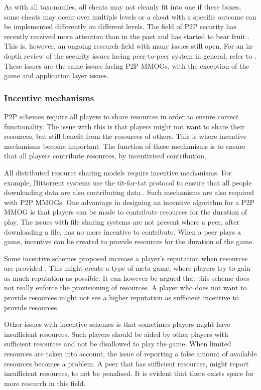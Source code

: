 As with all taxonomies, all cheats may not cleanly fit into one if these boxes, some cheats may occur over multiple levels or a cheat with a specific outcome can be implemented differently on different levels. The field of P2P security has recently received more attention than in the past and has
started to bear fruit \cite{survey_p2p_game_cheats}. This is, however, an ongoing research field with many issues still open. For an in-depth review
of the security issues facing peer-to-peer system in general, refer to \cite{p2p_security_issues}. These issues are the same issues facing P2P MMOGs, with the exception of the game and application layer issues.

\subsubsection{Incentive mechanisms}

P2P schemes require all players to share resources in order to ensure correct functionality. The issue with this is that players might not want to share their resources, but still benefit from the resources of others. This is where incentive mechanisms become important. The function of these
mechanisms is to ensure that all players contribute resources, by incentivised contribution.

All distributed resource sharing models require incentive mechanisms. For example, Bittorrent systems use the tit-for-tat protocol to ensure that all
people downloading data are also contributing data \cite{tit_for_tat}. Such mechanisms are also required with P2P MMOGs. One advantage in designing
an incentive algorithm for a P2P MMOG is that players can be made to contribute resources for the duration of play. The issues with file sharing
systems are not present where a peer, after downloading a file, has no more incentive to contribute. When a peer plays a game, incentive can be
created to provide resources for the duration of the game.

Some incentive schemes proposed increase a player's reputation when resources are provided \cite{classic_p2p_reputation} \cite{proactive_reputation}. This might create a type of meta game, where players try to gain as much reputation as possible. It can however be argued that this scheme does not really enforce the provisioning of resources. A player who does not want to provide resources might not see a higher reputation as sufficient incentive to provide resources.

Other issues with incentive schemes is that sometimes players might have insufficient resources. Such players should be aided by other players with
sufficient resources and not be disallowed to play the game. When limited resources are taken into account, the issue of reporting a false amount of
available resources becomes a problem. A peer that has sufficient resources, might report insufficient resources, to not be penalised. It is evident
that there exists space for more research in this field.


